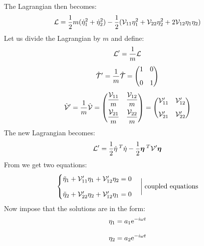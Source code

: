 The Lagrangian then becomes:
\begin{equation}
    \mathcal{L} = \dfrac{1}{2}m(\dot{\eta}_1^2 + \dot{\eta}_2^2) - \dfrac{1}{2}(\mathcal{V}_{11}\eta_1^2 + \mathcal{V}_{22}\eta_2^2 + 2\mathcal{V}_{12}\eta_1\eta_2 )
\end{equation}
Let us divide the Lagrangian by $m$ and define:
\begin{equation}
    \mathcal{L}' = \dfrac{1}{m}\mathcal{L}
\end{equation}
\begin{equation}
    \hat{\mathcal{T}}' = \dfrac{1}{m}\hat{\mathcal{T}} = \begin{pmatrix}
        1 & 0\\[8pt]
        0 & 1
    \end{pmatrix}
\end{equation}
\begin{equation}
    \hat{\mathcal{V}}' = \dfrac{1}{m}\hat{\mathcal{V}} = \begin{pmatrix}
        \dfrac{\mathcal{V}_{11}}{m} & \dfrac{\mathcal{V}_{12}}{m}\\[8pt]
        \dfrac{\mathcal{V}_{21}}{m} & \dfrac{\mathcal{V}_{22}}{m}
    \end{pmatrix} = \begin{pmatrix}
        \mathcal{V}_{11}' & \mathcal{V}_{12}'\\[8pt]
        \mathcal{V}_{21}' & \mathcal{V}_{22}'
    \end{pmatrix}
\end{equation}
The new Lagrangian becomes:
\begin{equation}
    \mathcal{L}' = \dfrac{1}{2}\dot{\vb{\eta}}^{\;T} \dot{\vb{\eta}} - \dfrac{1}{2}\boldsymbol{\eta}^{\;T} \mathcal{V}' \boldsymbol{\eta}
\end{equation}
From \eleref\;we get two equations:
\begin{equation}
    \begin{cases}
        \ddot{\eta}_1 + \mathcal{V}'_{11}\eta_1 + \mathcal{V}'_{12}\eta_2 = 0\\[8pt]
        \ddot{\eta}_2 + \mathcal{V}'_{22}\eta_2 + \mathcal{V}'_{12}\eta_1 = 0
    \end{cases} \bigg|\;\text{coupled equations}
\end{equation}
Now impose that the solutions are in the form:
\begin{equation}
    \begin{split}
        \eta_1 = a_1\mathrm{e}^{-i\omega t} \\[8pt]
        \eta_2 = a_2\mathrm{e}^{-i\omega t}
    \end{split}
\end{equation}
